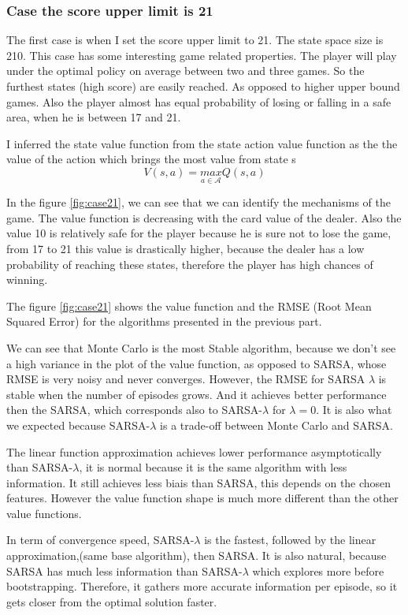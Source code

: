 \documentclass[12pt,a4paper]{article}
\begin{document}
\subsubsection{Case the score upper limit is 21}

The first case is when I set the score upper limit to 21. The state space size is 210.
This case has some interesting game related properties. The player will play under the optimal policy on average between two and three games. So the furthest states (high score) are easily reached. As opposed to higher upper bound games. Also the player almost has equal probability of losing or falling in a safe area, when he is between 17 and 21. 

I inferred the state value function from the state action value function as the the value of the action which brings the most  value from state s \[V(s,a) = \underset{a\in\mathcal{A}}{max}{Q(s, a)}\]  

In the figure \ref{fig:case21}, we can see that we can identify the mechanisms of the game. The value function is decreasing with the card value of the dealer. Also the value 10 is relatively safe for the player because he is sure not to lose the game, from 17 to 21 this value is drastically higher, because the dealer has a low probability of reaching these states, therefore the player has high chances of winning.

The figure \ref{fig:case21} shows the value function and the RMSE (Root Mean Squared Error) for the algorithms presented in the previous part.

We can see that Monte Carlo is the most Stable algorithm, because we don't see a high variance in the plot of the value function, as opposed to SARSA, whose RMSE is very noisy and never converges. However, the RMSE for SARSA $\lambda$ is stable when the number of episodes grows. And it achieves better performance then the SARSA, which corresponds also to SARSA-$\lambda$ for $\lambda=0$. It is also what we expected because SARSA-$\lambda$ is a trade-off between Monte Carlo and SARSA.

The linear function approximation achieves lower performance asymptotically than SARSA-$\lambda$, it is normal because it is the same algorithm with less information. It still achieves less biais than SARSA, this depends on the chosen features. However the value function shape is much more different than the other value functions.

In term of convergence speed, SARSA-$\lambda$ is the fastest, followed by the linear approximation,(same base algorithm), then SARSA. It is also natural, because SARSA has much less information than SARSA-$\lambda$ which explores more before bootstrapping. Therefore, it gathers more accurate information per episode, so it gets closer from the optimal solution faster.
\end{document}
